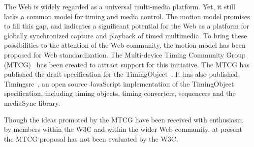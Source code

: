 The Web is widely regarded as a universal multi-media platform. Yet, it still
lacks a common model for timing and media control. The motion model promises
to fill this gap, and indicates a significant potential for the Web as a
platform for globally synchronized capture and playback of timed multimedia.
To bring these possibilities to the attention of the Web community, the motion
model has been proposed for Web standardization. The Multi-device Timing
Community Group (MTCG)~\cite{mtcg} has been created to attract support for
this initiative. The MTCG has published the draft specification for the 
TimingObject~\cite{timingobject}. It has also published Timingsrc~\cite{timingsrc}, an open
source JavaScript implementation of the TimingObject specification, including
timing objects, timing converters, sequencers and the mediaSync library.

Though the ideas promoted by the MTCG have been received with enthusiasm by
members within the W3C and within the wider Web community, at present the MTCG
proposal has not been evaluated by the W3C.
